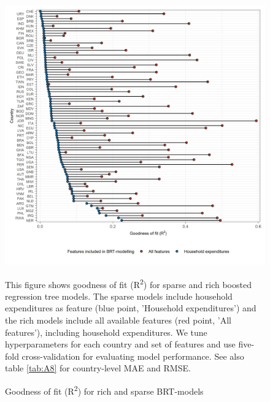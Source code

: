 \documentclass[12pt, a4paper]{article}
\newenvironment{subcaption2}
{\strut
\vspace{-5pt}
\begin{minipage}[b]{0.95\textwidth}
  \hspace*{-\parindent}
  \footnotesize}
 {\end{minipage}}
\begin{document}
\begin{refsection}
\begin{figure}[ht!]
    \centering
    \caption{Goodness of fit (R\textsuperscript{2}) for rich and sparse BRT-models}\label{fig:comparison}
    \includegraphics[width=\textwidth]{1_Figures/Figures_Appendix/Figure_Comparison_Models.jpg}
    \label{fig:comparison_models}
    \begin{subcaption2}
    This figure shows goodness of fit (R\textsuperscript{2}) for sparse and rich boosted regression tree models. The sparse models include household expenditures as feature (blue point, 'Household expenditures') and the rich models include all available features (red point, 'All features'), including household expenditures. We tune hyperparameters for each country and set of features and use five-fold cross-validation for evaluating model performance. See also table \ref{tab:A8} for country-level MAE and RMSE.
    \end{subcaption2}
\end{figure}

\clearpage


\clearpage


\clearpage


\clearpage


\end{refsection}
\end{document}
